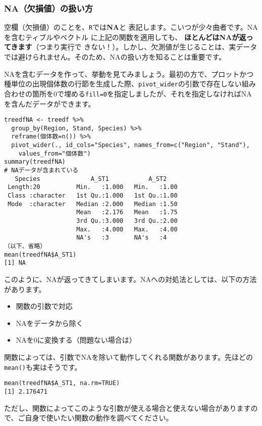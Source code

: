     \subsubsection{NA（欠損値）の扱い方}
\label{na_treatment}
空欄（欠損値）のことを、\texttt{R}では\textbf{NA}と
表記します。こいつが少々曲者です。NAを含むティブルやベクトル
に上記の関数を適用しても、
\textbf{ほとんどはNAが返ってきます}（つまり実行で
きない！）。しかし、欠測値が生じることは、実データでは避けられません。そのため、NAの扱い方を知ることは重要です。

NAを含むデータを作って、挙動を見てみましょう。最初の方で、プロットかつ種単位の出現個体数の行節を生成した際、\verb|pivot_wider|の引数で存在しない組み合わせの箇所を0で埋める\verb|fill=0|を指定しましたが、それを指定しなければNAを含んだデータができます。
\begin{verbatim}
treedfNA <- treedf %>%
  group_by(Region, Stand, Species) %>%
  reframe(個体数=n()) %>%
  pivot_wider(., id_cols="Species", names_from=c("Region", "Stand"),
    values_from="個体数")
summary(treedfNA)
# NAデータが含まれている
   Species              A_ST1           A_ST2     
 Length:20          Min.   :1.000   Min.   :1.00  
 Class :character   1st Qu.:1.000   1st Qu.:1.00  
 Mode  :character   Median :2.000   Median :1.50  
                    Mean   :2.176   Mean   :1.75  
                    3rd Qu.:3.000   3rd Qu.:2.00  
                    Max.   :4.000   Max.   :4.00  
                    NA's   :3       NA's   :4     
（以下、省略）
mean(treedfNA$A_ST1)
[1] NA
\end{verbatim}
このように、NAが返ってきてしまいます。NAへの対処法としては、以下の方法があります。
\begin{itemize}
	\item 関数の引数で対応
	\item NAをデータから除く
	\item NAを0に変換する（問題ない場合は）
\end{itemize}

関数によっては、引数でNAを除いて動作してくれる関数があります。先ほどの\verb|mean()|も実はそうです。
\begin{verbatim}
mean(treedfNA$A_ST1, na.rm=TRUE)
[1] 2.176471
\end{verbatim}
ただし、関数によってこのような引数が使える場合と使えない場合がありますので、ご自身で使いたい関数の動作を調べてください。

